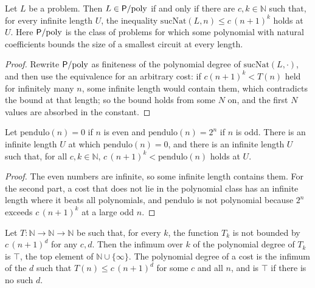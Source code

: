 \begin{theorem}
  \label{thm:infinite-psobrepoly-iff-infinito}
  \leanok
  \own{}
  Let $L$ be a problem. Then $L \in \mathsf{P}/\mathrm{poly}$ if and only if there are $c, k \in \mathbb{N}$ such that, for every
  infinite length $U$, the inequality $\mathrm{sucNat}(L, n) \le c\,(n+1)^k$ holds at $U$. Here $\mathsf{P}/\mathrm{poly}$ is the class
  of problems for which some polynomial with natural coefficients bounds the size of a smallest circuit at every length.
\end{theorem}

\begin{proof}
  \leanok
  Rewrite $\mathsf{P}/\mathrm{poly}$ as finiteness of the polynomial degree of $\mathrm{sucNat}(L, \cdot)$, and then use the equivalence
  for an arbitrary cost: if $c(n+1)^k < T(n)$ held for infinitely many $n$, some infinite length would contain them,
  which contradicts the bound at that length; so the bound holds from some $N$ on, and the first $N$ values are
  absorbed in the constant.
\end{proof}

\begin{theorem}
  \label{thm:infinite-ambos}
  \leanok
  \own{}
  Let $\mathrm{pendulo}(n) = 0$ if $n$ is even and $\mathrm{pendulo}(n) = 2^n$ if $n$ is odd. There is an infinite
  length $U$ at which $\mathrm{pendulo}(n) = 0$, and there is an infinite length $U$ such that, for all
  $c, k \in \mathbb{N}$, $c\,(n+1)^k < \mathrm{pendulo}(n)$ holds at $U$.
\end{theorem}

\begin{proof}
  \leanok
  The even numbers are infinite, so some infinite length contains them. For the second part, a cost that does not
  lie in the polynomial class has an infinite length where it beats all polynomials, and $\mathrm{pendulo}$ is not
  polynomial because $2^n$ exceeds $c\,(n+1)^k$ at a large odd $n$.
\end{proof}

\begin{theorem}
  \label{thm:infinite-no-llega}
  \leanok
  \own{}
  Let $T : \mathbb{N} \to \mathbb{N} \to \mathbb{N}$ be such that, for every $k$, the function $T_k$ is not bounded by
  $c\,(n+1)^d$ for any $c, d$. Then the infimum over $k$ of the polynomial degree of $T_k$ is $\top$, the top element of
  $\mathbb{N} \cup \{\infty\}$. The polynomial degree of a cost is the infimum of the $d$ such that
  $T(n) \le c\,(n+1)^d$ for some $c$ and all $n$, and is $\top$ if there is no such $d$.
\end{theorem}

